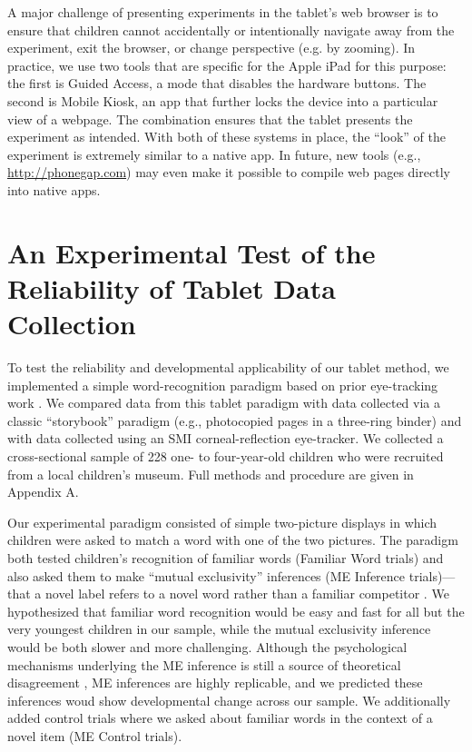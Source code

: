 \documentclass[man,noapacite]{apa2}
\begin{document}
A major challenge of presenting experiments in the tablet's web browser is to ensure that children cannot accidentally or intentionally navigate away from the experiment, exit the browser, or change perspective (e.g. by zooming). In practice, we use two tools that are specific for the Apple iPad for this purpose: the first is Guided Access, a mode that disables the hardware buttons. The second is Mobile Kiosk, an app that further locks the device into a particular view of a webpage. The combination ensures that the tablet presents the experiment as intended. With both of these systems in place, the ``look'' of the experiment is extremely similar to a native app. In future, new tools (e.g., \url{http://phonegap.com}) may even make it possible to compile web pages directly into native apps.

\section{An Experimental Test of the Reliability of Tablet Data Collection}
 
To test the reliability and developmental applicability of our tablet method, we implemented a simple word-recognition paradigm based on prior eye-tracking work \cite{fernald1998,fernald2006,bion2013}. We compared data from this tablet paradigm with data collected via a classic ``storybook'' paradigm (e.g., photocopied pages in a three-ring binder) and with data collected using an SMI corneal-reflection eye-tracker. We collected a cross-sectional sample of 228 one- to four-year-old children who were recruited from a local children's museum. Full methods and procedure are given in Appendix A. 

Our experimental paradigm consisted of simple two-picture displays in which children were asked to match a word with one of the two pictures. The paradigm both tested children's recognition of familiar words (Familiar Word trials) and also asked them to make ``mutual exclusivity''  inferences  (ME Inference trials)---that a novel label refers to a novel word rather than a familiar competitor \cite{markman1988}. We hypothesized that familiar word recognition would be easy and fast for all but the very youngest children in our sample, while the mutual exclusivity inference would be both slower and more challenging. Although the psychological mechanisms underlying the ME inference is still a source of theoretical disagreement \cite{markman2003,diesendruck2001,frank2009,bion2013}, ME inferences are highly replicable, and we predicted these inferences woud show developmental change across our sample. We additionally added control trials where we asked about familiar words in the context of a novel item (ME Control trials).
\end{document}
